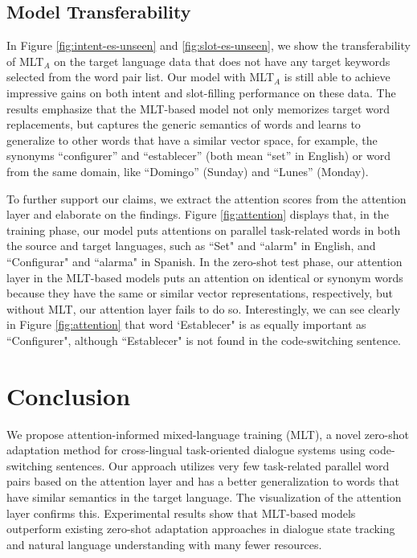 \documentclass[letterpaper]{article} %
\begin{document}
\subsection{Model Transferability}
In Figure \ref{fig:intent-es-unseen} and \ref{fig:slot-es-unseen}, we show the transferability of MLT$_A$ on the target language data that does not have any target keywords selected from the word pair list. Our model with MLT$_A$ is still able to achieve impressive gains on both intent and slot-filling performance on these data. The results emphasize that the MLT-based model not only memorizes target word replacements, but captures the generic semantics of words and learns to generalize to other words that have a similar vector space, for example, the synonyms ``configurer'' and ``establecer'' (both mean ``set'' in English) or word from the same domain, like ``Domingo'' (Sunday) and ``Lunes'' (Monday).

To further support our claims, we extract the attention scores from the attention layer and elaborate on the findings. Figure \ref{fig:attention} displays that, in the training phase, our model puts attentions on parallel task-related words in both the source and target languages, such as ``Set" and ``alarm" in English, and ``Configurar" and ``alarma" in Spanish. In the zero-shot test phase, our attention layer in the MLT-based models puts an attention on identical or synonym words because they have the same or similar vector representations, respectively, but without MLT, our attention layer fails to do so.
Interestingly, we can see clearly in Figure \ref{fig:attention} that word `Establecer" is as equally important as ``Configurer", although ``Establecer" is not found in the code-switching sentence.

\section{Conclusion}
We propose attention-informed mixed-language training (MLT), a novel zero-shot adaptation method for cross-lingual task-oriented dialogue systems using code-switching sentences. Our approach utilizes very few task-related parallel word pairs based on the attention layer and has a better generalization to words that have similar semantics in the target language. The visualization of the attention layer confirms this. Experimental results show that MLT-based models outperform existing zero-shot adaptation approaches in dialogue state tracking and natural language understanding with many fewer resources.
\end{document}
